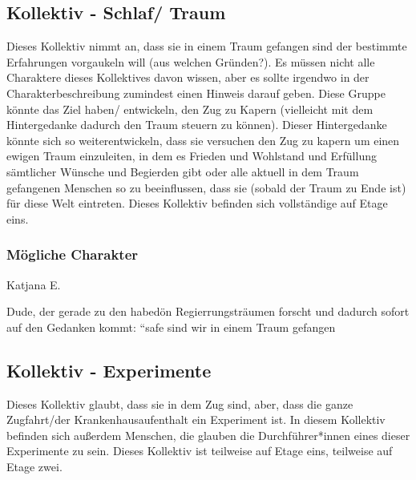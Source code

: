 \documentclass[12pt, a4paper, openany]{report}
\let\tempone\itemize
\let\temptwo\enditemize
\renewenvironment{itemize}{\tempone\addtolength{\itemsep}{-0.5\baselineskip}}{\temptwo}
\begin{document}
\subsection{Kollektiv - Schlaf/ Traum}
Dieses Kollektiv nimmt an, dass sie in einem Traum gefangen sind der bestimmte Erfahrungen vorgaukeln will (aus welchen Gründen?).
Es müssen nicht alle Charaktere dieses Kollektives davon wissen, aber es sollte irgendwo in der Charakterbeschreibung zumindest einen Hinweis darauf geben.
Diese Gruppe könnte das Ziel haben/ entwickeln, den Zug zu Kapern (vielleicht mit dem Hintergedanke dadurch den Traum steuern zu können).
Dieser Hintergedanke könnte sich so weiterentwickeln, dass sie versuchen den Zug
zu kapern um einen ewigen Traum einzuleiten, in dem es Frieden und Wohlstand und Erfüllung sämtlicher Wünsche und Begierden gibt oder alle aktuell in dem Traum
gefangenen Menschen so zu beeinflussen, dass sie (sobald der Traum zu Ende ist)
für diese Welt eintreten.
Dieses Kollektiv befinden sich vollständige auf Etage eins.

\subsubsection{Mögliche Charakter}
\begin{itemize}
  \item Katjana E.
  \item Dude, der gerade zu den habedön Regierrungsträumen forscht und dadurch
    sofort auf den Gedanken kommt: ``safe sind wir in einem Traum gefangen
\end{itemize}

\subsection{Kollektiv - Experimente}
Dieses Kollektiv glaubt, dass sie in dem Zug sind, aber, dass die ganze Zugfahrt/der Krankenhausaufenthalt ein Experiment ist. 
In diesem Kollektiv befinden sich außerdem Menschen, die glauben die Durchführer*innen eines dieser Experimente zu sein.
Dieses Kollektiv ist teilweise auf Etage eins, teilweise auf Etage zwei.\\
\end{document}
